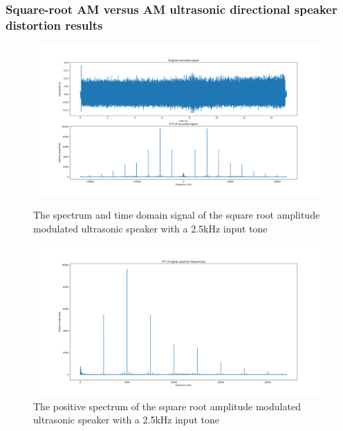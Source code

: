 \subsubsection{Square-root AM versus AM ultrasonic directional speaker distortion results}
\begin{figure}[ht!]
    \centering
    \begin{minipage}{0.49\textwidth}
        \centering
        
            \centering
            \includegraphics[width=\textwidth]{Figures/Testing/Distortion/SQRT_fft_sig_straighton.png}
            \caption{The spectrum and time domain signal of the square root amplitude modulated ultrasonic speaker with a 2.5kHz input tone}
            \label{fig:sqrt_fft_dist}
        
        
            \centering
            \includegraphics[width=\textwidth]{Figures/Testing/Distortion/SQRT_fft_pos_straighton.png}
            \caption{The positive spectrum of the square root amplitude modulated ultrasonic speaker with a 2.5kHz input tone}
            \label{fig:sqrt_fft_dist_pos}
        
    \end{minipage}\hfill
    \begin{minipage}{0.49\textwidth}
        \centering
        

\end{minipage}
\end{figure}
